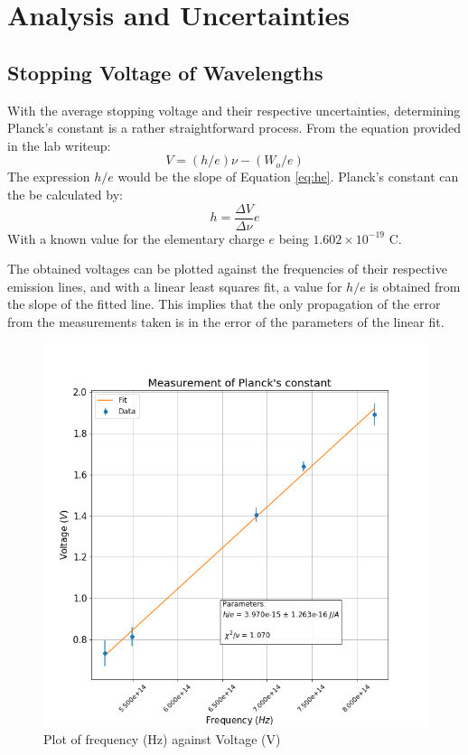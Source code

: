 \documentclass[a4paper, twocolumn]{article}
\begin{document}
\section{Analysis and Uncertainties}
\subsection{Stopping Voltage of Wavelengths}
With the average stopping voltage and their respective uncertainties, determining Planck's constant
is a rather straightforward process. From the equation provided in the lab writeup:
\begin{equation} \label{eq:he}
 V = (h/e) \nu - (W_o/e)
\end{equation}
The expression $h/e$ would be the slope of Equation \ref{eq:he}. Planck's constant can the be calculated by:
\begin{equation*} \label{eq:planck}
 h = \frac{\Delta V}{\Delta \nu} e
\end{equation*}
With a known value for the elementary charge $e$ being $1.602\times 10^{-19}$ C.

The obtained voltages can be plotted against the frequencies of their respective emission lines, and with a
linear least squares fit, a value for $h/e$ is obtained from the slope of the fitted line. This implies
that the only propagation of the error from the measurements taken is in the error of the parameters of the
linear fit.
\begin{figure}[h!]
 \centering
 \includegraphics[scale = 0.4]{planck}
 \caption{Plot of frequency (Hz) against Voltage (V)}
 \label{fig:planck}
\end{figure}
\end{document}
